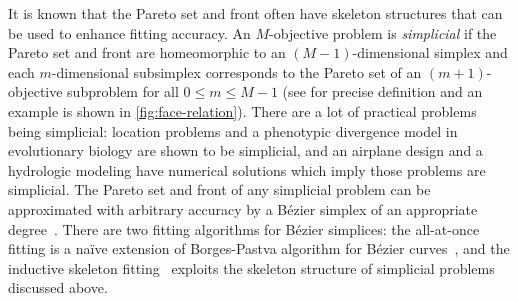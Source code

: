 \documentclass[letterpaper]{article} %
\theoremstyle{plain}
\begin{document}
It is known that the Pareto set and front often have skeleton structures that can be used to enhance fitting accuracy.
An $M$-objective problem is \emph{simplicial} if the Pareto set and front are homeomorphic to an $(M - 1)$-dimensional simplex and each $m$-dimensional subsimplex corresponds to the Pareto set of an $(m + 1)$-objective subproblem for all $0 \le m \leq M - 1$ (see \cite{Hamada2019} for precise definition and an example is shown in \cref{fig:face-relation}).
There are a lot of practical problems being simplicial: location problems \cite{Kuhn1967} and a phenotypic divergence model in evolutionary biology \cite{Shoval2012} are shown to be simplicial, and an airplane design \cite{Mastroddi2013} and a hydrologic modeling \cite{Vrugt2003} have numerical solutions which imply those problems are simplicial.
The Pareto set and front of any simplicial problem can be approximated with arbitrary accuracy by a B\'ezier simplex of an appropriate degree~\cite{Kobayashi2019}.
There are two fitting algorithms for B\'ezier simplices: the all-at-once fitting is a na\"ive extension of Borges-Pastva algorithm for B\'ezier curves~\cite{Borges2002}, and the inductive skeleton fitting~\cite{Kobayashi2019} exploits the skeleton structure of simplicial problems discussed above.
\end{document}
